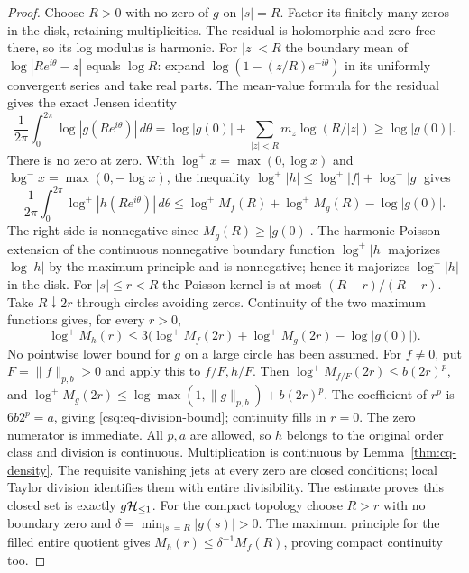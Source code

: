 \begin{proof}
Choose $R>0$ with no zero of $g$ on $|s|=R$. Factor its finitely
many zeros in the disk, retaining multiplicities. The residual is
holomorphic and zero-free there, so its log modulus is harmonic.
For $|z|<R$ the boundary mean of $\log|Re^{i\theta}-z|$ equals
$\log R$: expand $\log(1-(z/R)e^{-i\theta})$ in its uniformly
convergent series and take real parts. The mean-value formula for
the residual gives the exact Jensen identity
\[
 \frac1{2\pi}\int_0^{2\pi}\log|g(Re^{i\theta})|\,d\theta
 =\log|g(0)|+\sum_{|z|<R}m_z\log(R/|z|)\geq\log|g(0)|.
\]
There is no zero at zero. With
$\log^+x=\max(0,\log x)$ and $\log^-x=\max(0,-\log x)$,
the inequality $\log^+|h|\leq\log^+|f|+\log^-|g|$ gives
\begin{equation}\label{csq:eq-division-mean}
 \frac1{2\pi}\int_0^{2\pi}\log^+|h(Re^{i\theta})|\,d\theta
 \leq\log^+M_f(R)+\log^+M_g(R)-\log|g(0)|.
\end{equation}
The right side is nonnegative since $M_g(R)\geq|g(0)|$.
The harmonic Poisson extension of the continuous nonnegative boundary
function $\log^+|h|$ majorizes $\log|h|$ by the maximum principle
and is nonnegative; hence it majorizes $\log^+|h|$ in the disk.
For $|s|\leq r<R$ the Poisson kernel is at most $(R+r)/(R-r)$.
Take $R\downarrow2r$ through circles avoiding zeros. Continuity of
the two maximum functions gives, for every $r>0$,
\begin{equation}\label{csq:eq-division-radial}
 \log^+M_h(r)\leq
 3\bigl(\log^+M_f(2r)+\log^+M_g(2r)-\log|g(0)|\bigr).
\end{equation}
No pointwise lower bound for $g$ on a large circle has been assumed.
For $f\ne0$, put $F=\|f\|_{p,b}>0$ and apply this to $f/F,h/F$.
Then $\log^+M_{f/F}(2r)\leq b(2r)^p$, and
$\log^+M_g(2r)\leq\log\max(1,\|g\|_{p,b})+b(2r)^p$.
The coefficient of $r^p$ is $6b2^p=a$, giving
\eqref{csq:eq-division-bound}; continuity fills in $r=0$.
The zero numerator is immediate. All $p,a$ are allowed, so $h$
belongs to the original order class and division is continuous.
Multiplication is continuous by Lemma~\ref{thm:cq-density}.
The requisite vanishing jets at every zero are closed conditions;
local Taylor division identifies them with entire divisibility.
The estimate proves this closed set is exactly $g\mathcal H_{\leq 1}$.
For the compact topology choose $R>r$ with no boundary zero and
$\delta=\min_{|s|=R}|g(s)|>0$. The maximum principle for the filled
entire quotient gives $M_h(r)\leq\delta^{-1}M_f(R)$, proving
compact continuity too.
\end{proof}

